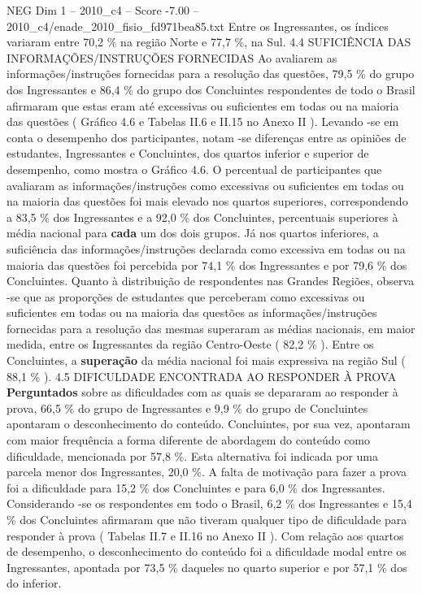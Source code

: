 \begin{textsample}{NEG Dim 1 – 2010\_c4 – Score -7.00 – 2010\_c4/enade\_2010\_fisio\_fd971bea85.txt}
Entre os Ingressantes, os índices variaram entre 70,2 \% na região Norte e 77,7 \%, na Sul. 4.4 SUFICIÊNCIA DAS INFORMAÇÕES/INSTRUÇÕES FORNECIDAS Ao avaliarem as informações/instruções fornecidas para a resolução das questões, 79,5 \% do grupo dos Ingressantes e 86,4 \% do grupo dos Concluintes respondentes de todo o Brasil afirmaram que estas eram até excessivas ou suficientes em todas ou na maioria das questões ( Gráfico 4.6 e Tabelas II.6 e II.15 no Anexo II ).
Levando -se em conta o desempenho dos participantes, notam -se diferenças entre as opiniões de estudantes, Ingressantes e Concluintes, dos quartos inferior e superior de desempenho, como mostra o Gráfico 4.6.
O percentual de participantes que avaliaram as informações/instruções como excessivas ou suficientes em todas ou na maioria das questões foi mais elevado nos quartos superiores, correspondendo a 83,5 \% dos Ingressantes e a 92,0 \% dos Concluintes, percentuais superiores à média nacional para \textbf{cada} um dos dois grupos.
Já nos quartos inferiores, a suficiência das informações/instruções declarada como excessiva em todas ou na maioria das questões foi percebida por 74,1 \% dos Ingressantes e por 79,6 \% dos Concluintes.
Quanto à distribuição de respondentes nas Grandes Regiões, observa -se que as proporções de estudantes que perceberam como excessivas ou suficientes em todas ou na maioria das questões as informações/instruções fornecidas para a resolução das mesmas superaram as médias nacionais, em maior medida, entre os Ingressantes da região Centro-Oeste ( 82,2 \% ).
Entre os Concluintes, a \textbf{superação} da média nacional foi mais expressiva na região Sul ( 88,1 \% ). 4.5 DIFICULDADE ENCONTRADA AO RESPONDER À PROVA \textbf{Perguntados} sobre as dificuldades com as quais se depararam ao responder à prova, 66,5 \% do grupo de Ingressantes e 9,9 \% do grupo de Concluintes apontaram o desconhecimento do conteúdo.
Concluintes, por sua vez, apontaram com maior frequência a forma diferente de abordagem do conteúdo como dificuldade, mencionada por 57,8 \%.
Esta alternativa foi indicada por uma parcela menor dos Ingressantes, 20,0 \%.
A falta de motivação para fazer a prova foi a dificuldade para 15,2 \% dos Concluintes e para 6,0 \% dos Ingressantes.
Considerando -se os respondentes em todo o Brasil, 6,2 \% dos Ingressantes e 15,4 \% dos Concluintes afirmaram que não tiveram qualquer tipo de dificuldade para responder à prova ( Tabelas II.7 e II.16 no Anexo II ).
Com relação aos quartos de desempenho, o desconhecimento do conteúdo foi a dificuldade modal entre os Ingressantes, apontada por 73,5 \% daqueles no quarto superior e por 57,1 \% dos do inferior.

\end{textsample}
